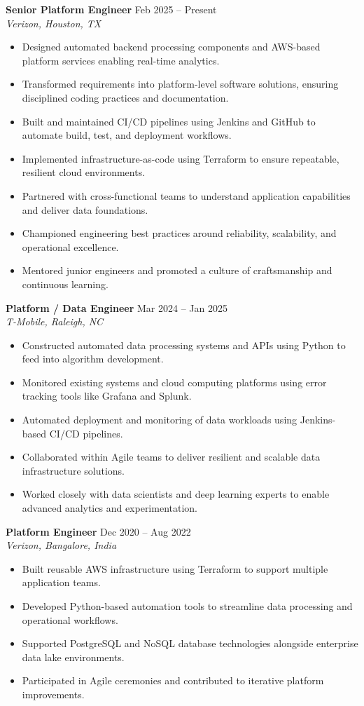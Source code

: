 \documentclass[10pt]{article}
\begin{document}
\textbf{Senior Platform Engineer} \hfill Feb 2025 -- Present \\
\textit{Verizon, Houston, TX}
\begin{itemize}[leftmargin=*, itemsep=3pt]
    \item Designed automated backend processing components and AWS-based platform services enabling real-time analytics.
    \item Transformed requirements into platform-level software solutions, ensuring disciplined coding practices and documentation.
    \item Built and maintained CI/CD pipelines using Jenkins and GitHub to automate build, test, and deployment workflows.
    \item Implemented infrastructure-as-code using Terraform to ensure repeatable, resilient cloud environments.
    \item Partnered with cross-functional teams to understand application capabilities and deliver data foundations.
    \item Championed engineering best practices around reliability, scalability, and operational excellence.
    \item Mentored junior engineers and promoted a culture of craftsmanship and continuous learning.
\end{itemize}

\textbf{Platform / Data Engineer} \hfill Mar 2024 -- Jan 2025 \\
\textit{T-Mobile, Raleigh, NC}
\begin{itemize}[leftmargin=*, itemsep=3pt]
    \item Constructed automated data processing systems and APIs using Python to feed into algorithm development.
    \item Monitored existing systems and cloud computing platforms using error tracking tools like Grafana and Splunk.
    \item Automated deployment and monitoring of data workloads using Jenkins-based CI/CD pipelines.
    \item Collaborated within Agile teams to deliver resilient and scalable data infrastructure solutions.
    \item Worked closely with data scientists and deep learning experts to enable advanced analytics and experimentation.
\end{itemize}

\textbf{Platform Engineer} \hfill Dec 2020 -- Aug 2022 \\
\textit{Verizon, Bangalore, India}
\begin{itemize}[leftmargin=*, itemsep=3pt]
    \item Built reusable AWS infrastructure using Terraform to support multiple application teams.
    \item Developed Python-based automation tools to streamline data processing and operational workflows.
    \item Supported PostgreSQL and NoSQL database technologies alongside enterprise data lake environments.
    \item Participated in Agile ceremonies and contributed to iterative platform improvements.
\end{itemize}
\end{document}
